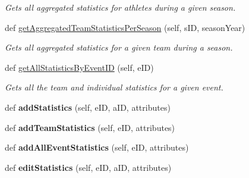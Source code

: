 \begin{DoxyCompactItemize}
\begin{DoxyCompactList}\small\item\em Gets all aggregated statistics for athletes during a given season. \end{DoxyCompactList}\item 
def \hyperlink{classhandler_1_1medal__based__event_1_1_medal_based_event_handler_a6471325297119ddb6400226fe9841caa}{get\+Aggregated\+Team\+Statistics\+Per\+Season} (self, s\+ID, season\+Year)
\begin{DoxyCompactList}\small\item\em Gets all aggregated statistics for a given team during a season. \end{DoxyCompactList}\item 
def \hyperlink{classhandler_1_1medal__based__event_1_1_medal_based_event_handler_a32e8ff028eb835d5a43c7b609774d696}{get\+All\+Statistics\+By\+Event\+ID} (self, e\+ID)
\begin{DoxyCompactList}\small\item\em Gets all the team and individual statistics for a given event. \end{DoxyCompactList}\item 
\mbox{\label{classhandler_1_1medal__based__event_1_1_medal_based_event_handler_a09b98e387d865f6bfb673f616ef36c39}} 
def {\bfseries add\+Statistics} (self, e\+ID, a\+ID, attributes)
\item 
\mbox{\label{classhandler_1_1medal__based__event_1_1_medal_based_event_handler_aa4d7d8a26bce21c38aa206fd3e1160bb}} 
def {\bfseries add\+Team\+Statistics} (self, e\+ID, attributes)
\item 
\mbox{\label{classhandler_1_1medal__based__event_1_1_medal_based_event_handler_a84bd7872bd93c0f633664c4a36d08acd}} 
def {\bfseries add\+All\+Event\+Statistics} (self, e\+ID, attributes)
\item 
\mbox{\label{classhandler_1_1medal__based__event_1_1_medal_based_event_handler_a49e8685bb84e9b01dbb7fc776a0d0207}} 
def {\bfseries edit\+Statistics} (self, e\+ID, a\+ID, attributes)
\item 

\end{DoxyCompactItemize}
